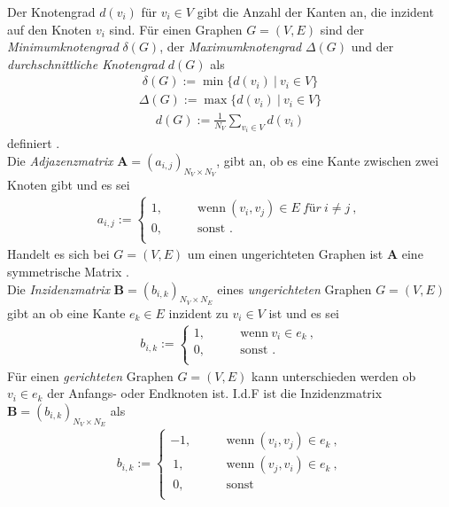 \documentclass[12pt, a4paper]{report}
\begin{document}
Der Knotengrad $d(v_i)$ für $v_i \in V$ gibt die Anzahl der Kanten an, die inzident auf den Knoten $v_i$ sind. Für einen Graphen $G=(V,E)$ sind der \textit{Minimumknotengrad} $\delta(G)$, der \textit{Maximumknotengrad} $\Delta(G)$ und der \textit{durchschnittliche Knotengrad} $d(G)$ als
\begin{align}
\delta(G):=\min\{d(v_i) \ | \ v_i \in V\}
\end{align}
\begin{align}
\Delta(G):=\max\{d(v_i) \ | \ v_i \in V\}
\end{align}
\begin{align}
d(G):=\frac{1}{N_V}\sum_{v_i \in V}d(v_i)
\end{align}
definiert \cite{diestel2006graph}.\\

Die \textit{Adjazenzmatrix} $\textbf{A}=(a_{i,j})_{N_V \times N_V}$, gibt an, ob es eine Kante zwischen zwei Knoten gibt und es sei 
\begin{align}
a_{i,j} := \begin{cases}
1, \qquad &\text{wenn} \ (v_i,v_j) \in E \ \textit{für} \ i \neq j \ ,\\
0, \qquad &\text{sonst \ .}\\
\end{cases}
\end{align}
Handelt es sich bei $G=(V,E)$ um einen ungerichteten Graphen ist $\textbf{A}$ eine symmetrische Matrix \cite{kolaczyk2009statistical}.\\
Die \textit{Inzidenzmatrix} $\textbf{\~B}=(b_{i,k})_{N_V \times N_E}$ eines \textit{ungerichteten} Graphen $G=(V,E)$ gibt an ob eine Kante $e_k \in E$ inzident zu $v_i \in V$ ist \cite{kolaczyk2009statistical} und es sei
\begin{align}
b_{i,k} := \begin{cases}
1, \qquad &\text{wenn} \ v_i \in e_k \ ,\\
0, \qquad &\text{sonst .}\\
\end{cases}
\end{align}
Für einen \textit{gerichteten} Graphen $G=(V,E)$ kann unterschieden werden ob $v_i \in e_k$ der Anfangs- oder Endknoten ist. \mbox{I.d.F} ist die Inzidenzmatrix $\textbf{B}=(b_{i,k})_{N_V \times N_E}$ als
\begin{align}
b_{i,k} := \begin{cases}
-1, \qquad &\text{wenn} \ (v_i,v_j) \in e_k \ ,\\
\ 1, \qquad &\text{wenn} \ (v_j,v_i) \in e_k \ ,\\
\ 0, \qquad &\text{sonst}\\
\end{cases}
\end{align}
\end{document}
